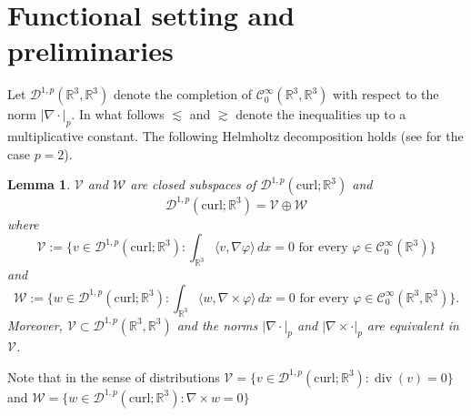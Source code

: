 \documentclass[12pt,leqno,twoside]{amsart}
\newtheorem{Lem}[Th]{Lemma}
\def\div{\mathop{\mathrm{div}}}
\def\R{\mathbb{R}}
\def\curl{\mathrm{curl}}
\def\V{\mathcal{V}}
\def\Wc{\mathscr{W}}
\def\W{\mathcal{W}}
\newcommand{\cC}{{\mathcal C}}
\newcommand{\cD}{{\mathcal D}}
\newcommand{\cV}{{\mathcal V}}
\newcommand{\cW}{{\mathcal W}}
\def\r{\mathbb{R}}
\def\r3{\mathbb{R}^3}
\def\Wc{\cD^{1,p}(\curl;\R^3)}
\def\curlop{\nabla\times}
\numberwithin{equation}{section}
\begin{document}
\section{Functional setting and preliminaries}\label{sec:setting}




Let $\cD^{1,p}(\R^3,\R^3)$ denote the completion of $\cC^{\infty}_0(\R^3,\R^3)$ with respect to the norm $|\nabla \cdot|_p$. In what follows $\lesssim$ and $\gtrsim$ denote the inequalities up to a multiplicative constant.
The following Helmholtz decomposition holds (see \cite{Mederski,MSchSz} for the case $p=2$).

\begin{Lem}\label{defof} $\V$ and $\cW$ are closed subspaces of $\Wc$  and
	\begin{equation}\label{HelmholzDec}
	\Wc=\V\oplus \W
	\end{equation}
where $$\cV:=\Big\{v\in \Wc: \int_{\R^3}\langle v,\nabla \varphi\rangle\,dx=0
\text{ for every $\varphi\in \cC^\infty_0(\R^3)$} \Big\}$$
and
$$
\cW:=\Big\{w\in \Wc: \int_{\R^3}\langle w,\curlop \varphi\rangle\,dx=0
\text{ for every $\varphi\in \cC^\infty_0(\R^3,\R^3)$} \Big\}.
$$
Moreover, $\cV\subset\cD^{1,p}(\r3,\r3)$ and the norms $|\nabla \cdot|_p$ and $|\curlop \cdot|_p$ are equivalent in $\V$. 
\end{Lem}

Note that in the sense of distributions $\cV = \{v\in\Wc: \div(v)=0\}$ and $\cW = \{w\in\Wc: \curlop w=0\}$
\end{document}
